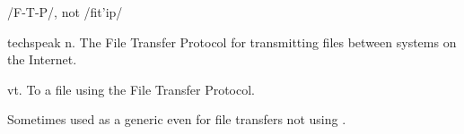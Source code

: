  /F-T-P/, not /fit'ip/

\begin{inparaenum}
	\item [techspeak] n. The File Transfer Protocol for transmitting files between systems on the Internet.
	\item vt. To  a file using the File Transfer Protocol.
	\item Sometimes used as a generic even for file transfers not using .
\end{inparaenum}

